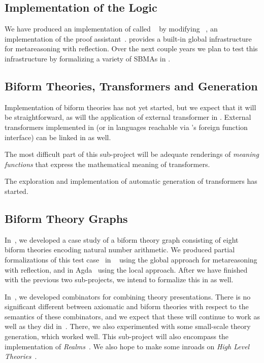 \documentclass[fleqn]{llncs}
\begin{document}
\subsection*{Implementation of the Logic}

We have produced an implementation of {\churchqe} called
{\HLQE}~\cite{CaretteFarmerLaskowski18} by modifying
{\HL}~\cite{Harrison09}, an implementation of the {\HOL} proof
assistant~\cite{GordonMelham93}.  {\HLQE} provides a built-in global
infrastructure for metareasoning with reflection.  Over the next
couple years we plan to test this infrastructure by formalizing a
variety of SBMAs in {\HLQE}.

\subsection*{Biform Theories, Transformers and Generation}

Implementation of biform theories has not yet started, but we
expect that it will be straightforward, as will the application
of external transformer in {\HLQE}.  External transformers
implemented in {\OCAML} (or in languages reachable via {\OCAML}'s foreign
function interface) can be linked in as well.

The most difficult part of this sub-project will be adequate
renderings of \emph{meaning functions} that express the mathematical
meaning of transformers.

The exploration and implementation of automatic generation of
transformers has started.

\subsection*{Biform Theory Graphs}

In~\cite{CaretteFarmer17}, we developed a case study of a biform
theory graph consisting of eight biform theories encoding natural number
arithmetic.  We produced partial formalizations of this test
case~\cite{CaretteFarmer17} in {\churchuqe}~\cite{Farmer17} using the
global approach for metareasoning with reflection, and in
Agda~\cite{Norell07,Norell09} using the local approach.  After we have
finished with the previous two sub-projects, we intend to formalize this
in {\HLQE} as well.

In~\cite{CaretteOConnorTPC}, we developed combinators for combining
theory presentations. There is no significant different between
axiomatic and biform theories with respect to the semantics of
these combinators, and we expect that these will continue to work
as well as they did in~\cite{MathSchemeExper}. There, we also
experimented with some small-scale theory generation, which worked
well. This sub-project will also encompass the implementation of
\emph{Realms}~\cite{CaretteEtAl14}.  We also hope to make some
inroads on \emph{High Level Theories}~\cite{HighLevelTheories}.
\end{document}
